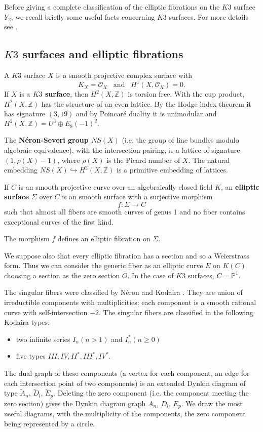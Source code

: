 \documentclass{amsart}
\begin{document}
Before giving a complete classification of the elliptic fibrations on the $K3$ surface $Y_2$, we recall briefly some useful facts concerning $K3$ surfaces. For more details see \cite{Ba} \cite{Y}.


\subsection{$K3$ surfaces and elliptic fibrations}

 
A $K3$ surface $X$ is a smooth projective complex surface with
\[
K_X=\mathcal O_X \,\,\,\,\, \text{and} \,\,\,\,\, H^1(X,\mathcal O_X)=0.
\]
If $X$ is a{\bf{ $K3$ surface}}, then $H^2(X,\mathbb{Z})$ is torsion free. With the cup product,  $H^2(X,\mathbb{Z})$
has the structure of an even lattice. By the Hodge index theorem it has signature $(3,19)$ and by Poincar\'e duality it is unimodular and  $H^2(X,\mathbb{Z})=U^3\oplus E_8(-1)^2.$

The {\bf{N\'eron-Severi group $NS(X)$}} (i.e. the group of line bundles modulo algebraic equivalence), with   the intersection pairing, is a lattice of signature $(1,\rho (X)-1)$, where $\rho(X)$ is the Picard number of $X$. The natural embedding $NS(X) \hookrightarrow H^2(X,\mathbb{Z})$ is a primitive embedding of lattices.

\bigskip

If $C$ is an smooth projective curve over an algebraically closed field $K$, an {\bf{elliptic surface}} $\Sigma$  
over $C$ is an smooth surface with a surjective morphism 
\[
f: \Sigma \rightarrow C
\]
such that almost all fibers are smooth curves of genus 1 and no fiber contains exceptional curves of the first kind.

The morphism $f$ defines an elliptic fibration on $\Sigma$.


 
We suppose also that every elliptic fibration has a section and so a Weierstrass form. Thus we can consider the generic fiber as an elliptic curve $E$ on $K(C)$ choosing a section as the zero section $\bar{O}$.
In the case of $K3$ surfaces, $C=\mathbb{P}^1$.

The singular fibers were classified by N\'eron \cite{Ne} and Kodaira \cite{Ko}. They are union of irreductible components with multiplicities; each component is a smooth rational curve with self-intersection $-2$.
The singular fibers are classified in the following Kodaira types:
\begin{itemize}
\item
two infinite series $I_n (n>1)$ and $I_n^* (n \geq 0)$ 
\item
five types $III,IV,II^*,I
II^*,IV^*$.
\end{itemize}
The dual graph of these components (a vertex for each component, an edge for each intersection point of two components)  is an extended Dynkin diagram of type $\tilde{A}_n$, $\tilde{D}_l$, $\tilde{E}_p$. Deleting the zero component (i.e. the component meeting the zero section) gives the Dynkin diagram graph $A_n$, $D_l$, $E_p$.   
 We draw the most useful diagrams, with the multiplicity of the components, the zero component being represented by a circle. 
\end{document}
